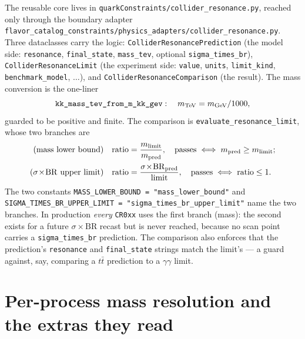 \documentclass[11pt]{article}
\newcommand{\sBR}{\sigma\!\times\!\mathrm{BR}}
\newcommand{\code}[1]{\texttt{#1}}
\theoremstyle{definition}
\begin{document}
The reusable core lives in \code{quarkConstraints/collider\_resonance.py}, reached
only through the boundary adapter
\code{flavor\_catalog\_constraints/physics\_adapters/collider\_resonance.py}.
Three dataclasses carry the logic:
\code{ColliderResonancePrediction} (the model side: \code{resonance},
\code{final\_state}, \code{mass\_tev}, optional \code{sigma\_times\_br}),
\code{ColliderResonanceLimit} (the experiment side: \code{value}, \code{units},
\code{limit\_kind}, \code{benchmark\_model}, $\dots$), and
\code{ColliderResonanceComparison} (the result). The mass conversion is the
one-liner
\begin{equation}
\code{kk\_mass\_tev\_from\_m\_kk\_gev}:\quad m_{\rm TeV} = m_{\rm GeV}/1000,
\label{eq:gev2tev}
\end{equation}
guarded to be positive and finite. The comparison is
\code{evaluate\_resonance\_limit}, whose two branches are
\begin{align}
\text{(mass lower bound)}\quad
&\text{ratio} = \frac{m_{\rm limit}}{m_{\rm pred}}, \quad
\text{passes} \iff m_{\rm pred} \ge m_{\rm limit};
\label{eq:ratiomass}\\
\text{($\sBR$ upper limit)}\quad
&\text{ratio} = \frac{\sBR_{\rm pred}}{\text{limit}}, \quad
\text{passes} \iff \text{ratio} \le 1.
\label{eq:ratiosbr}
\end{align}
The two constants \code{MASS\_LOWER\_BOUND = "mass\_lower\_bound"} and
\code{SIGMA\_TIMES\_BR\_UPPER\_LIMIT = "sigma\_times\_br\_upper\_limit"} name the
two branches. In production \emph{every} \code{CR0xx} uses the first branch
(mass): the second exists for a future $\sBR$ recast but is never reached,
because no scan point carries a \code{sigma\_times\_br} prediction. The
comparison also enforces that the prediction's \code{resonance} and
\code{final\_state} strings match the limit's --- a guard against, say, comparing
a $t\bar t$ prediction to a $\gamma\gamma$ limit.

\section{Per-process mass resolution and the extras they read}
\label{sec:extras}
\end{document}

